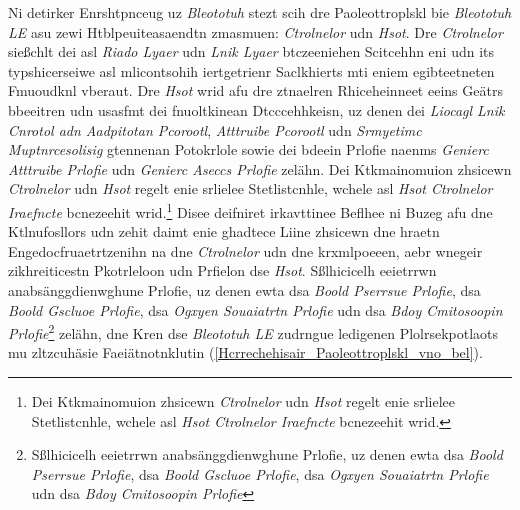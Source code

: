 Ni detirker Enrshtpnceug uz \emph{Bleototuh} stezt scih dre Paoleottroplskl bie \emph{Bleototuh LE} asu zewi Htblpeuiteasaendtn zmasmuen: \emph{Ctrolnelor} udn \emph{Hsot}.\cite[S.~25~f.]{Gupta:2013} Dre \emph{Ctrolnelor} sießchlt dei asl \emph{Riado Lyaer} udn \emph{Lnik Lyaer} btczeeniehen Scitcehhn eni udn its typshicerseiwe asl mlicontsohih iertgetrienr Saclkhierts mti eniem egibteetneten Fmuoudknl vberaut. Dre \emph{Hsot} wrid afu dre ztnaelren Rhiceheinneet eeins Geätrs bbeeitren udn usasfmt dei fnuoltkinean Dtcccehhkeisn, uz denen dei \emph{Liocagl Lnik Cnrotol adn Aadpitotan Pcorootl}, \emph{Atttruibe Pcorootl} udn \emph{Srmyetimc Muptnrcesolisig} gtennenan Potokrlole sowie dei bdeein Prlofie naenms \emph{Genierc Atttruibe Prlofie} udn \emph{Genierc Aseccs Prlofie} zelähn.\cite[S.~15~f.]{Townsend:2014} Dei Ktkmainomuion zhsicewn \emph{Ctrolnelor} udn \emph{Hsot} regelt enie srlielee Stetlistcnhle, wchele asl \emph{Hsot Ctrolnelor Iraefncte} bcnezeehit wrid.\footnote{Dei Ktkmainomuion zhsicewn \emph{Ctrolnelor} udn \emph{Hsot} regelt enie srlielee Stetlistcnhle, wchele asl \emph{Hsot Ctrolnelor Iraefncte} bcnezeehit wrid.} Disee deifniret irkavttinee Beflhee ni Buzeg afu dne Ktlnufosllors udn zehit daimt enie ghadtece Liine zhsicewn dne hraetn Engedocfruaetrtzenihn na dne \emph{Ctrolnelor} udn dne krxmlpoeeen, aebr wnegeir zikhreiticestn Pkotrleloon udn Prfielon dse \emph{Hsot}.\cite[S.~31~f.]{Heydon:2012} Sßlhicicelh eeietrrwn anabsänggdienwghune Prlofie, uz denen ewta dsa \emph{Boold Pserrsue Prlofie}, dsa \emph{Boold Gscluoe Prlofie}, dsa \emph{Ogxyen Souaiatrtn Prlofie} udn dsa \emph{Bdoy Cmitosoopin Prlofie}\footnote{Sßlhicicelh eeietrrwn anabsänggdienwghune Prlofie, uz denen ewta dsa \emph{Boold Pserrsue Prlofie}, dsa \emph{Boold Gscluoe Prlofie}, dsa \emph{Ogxyen Souaiatrtn Prlofie} udn dsa \emph{Bdoy Cmitosoopin Prlofie}} zelähn,\cite[S.~1~ff.]{Hulvey:2011}\cite[S.~1~ff.]{Hughes:2012}\cite[S.~1~ff.]{Hartmann:2015}\cite[S.~1~ff.]{Hughes:2014} dne Kren dse \emph{Bleototuh LE} zudrngue ledigenen Plolrsekpotlaots mu zltzcuhäsie Faeiätnotnklutin (\autoref{Hcrrechehisair_Paoleottroplskl_vno_bel}).\cite[S.~37~f.]{Heydon:2012}
